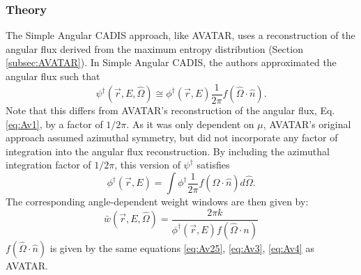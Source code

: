 \subsubsection*{Theory}

The Simple Angular CADIS approach, like AVATAR, uses a reconstruction of the
angular flux derived from the maximum entropy distribution (Section
\ref{subsec:AVATAR}). In Simple Angular CADIS, the authors approximated the
angular flux such that
%
\begin{equation}
\psi^{\dagger}(\vec{r}, E, \hat \Omega) \cong \phi^{\dagger}(\vec{r}, E)
\frac{1}{2\pi} f(\hat\Omega \cdot \hat n).
\label{eq:AvAngflux}
\end{equation}
Note that this differs from AVATAR's reconstruction of the angular flux,
Eq. \eqref{eq:Av1}, by a factor of $1/2\pi$. As it was only dependent on
$\mu$, AVATAR's original approach assumed azimuthal symmetry, but did not
incorporate any factor of integration into the angular flux reconstruction. By
including the azimuthal integration factor of $1/2\pi$, this version of
$\psi^{\dagger}$ satisfies
\begin{equation*}
  \phi^{\dagger}(\vec{r}, E) = \int \phi^{\dagger} \frac{1}{2\pi} f(\hat\Omega
  \cdot \hat n) d \hat\Omega .
\end{equation*}
The corresponding angle-dependent weight windows are then given by:
\begin{equation}
\bar {w} (\vec{r},E,\hat\Omega) = \frac{2 \pi k}{\phi^{\dagger}(\vec{r},E)
                                  f(\hat\Omega \cdot n)}
\end{equation}
$f(\hat\Omega \cdot \hat n)$ is given by the same equations
\eqref{eq:Av25}, \eqref{eq:Av3}, \eqref{eq:Av4} as AVATAR.

